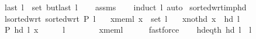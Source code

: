\begin{isabellebody}
\ \ \ {\isachardoublequoteopen}last\ l\ {\isasymnotin}\ set\ {\isacharparenleft}{\kern0pt}butlast\ l{\isacharparenright}{\kern0pt}{\isachardoublequoteclose}%
\endisataginvisible
{\isafoldinvisible}%
%
\isadeliminvisible
\isanewline
%
\endisadeliminvisible
%
\isadelimproof
\ \ %
\endisadelimproof
%
\isatagproof
{}\isamarkupfalse%
\ assms\isanewline
\ \ \isamarkupfalse%
\ {\isacharparenleft}{\kern0pt}induct\ l{\isacharparenright}{\kern0pt}\ auto%
\endisatagproof
{\isafoldproof}%
%
\isadelimproof
%
\endisadelimproof
%
\isadeliminvisible
%
\endisadeliminvisible
%
\isataginvisible
%
\isamarkuptrue%
\isamarkupfalse%
\ sorted{\isacharunderscore}{\kern0pt}wrt{\isacharunderscore}{\kern0pt}imp{\isacharunderscore}{\kern0pt}hd{\isacharcolon}{\kern0pt}\isanewline
\ \ \ l{\isacharunderscore}{\kern0pt}sorted{\isacharunderscore}{\kern0pt}wrt{\isacharcolon}{\kern0pt}\ {\isachardoublequoteopen}sorted{\isacharunderscore}{\kern0pt}wrt\ P\ l{\isachardoublequoteclose}\isanewline
\ \ \ x{\isacharunderscore}{\kern0pt}mem{\isacharunderscore}{\kern0pt}l{\isacharcolon}{\kern0pt}\ {\isachardoublequoteopen}x\ {\isasymin}\ set\ l{\isachardoublequoteclose}\isanewline
\ \ \ x{\isacharunderscore}{\kern0pt}not{\isacharunderscore}{\kern0pt}hd{\isacharcolon}{\kern0pt}\ {\isachardoublequoteopen}x\ {\isasymnoteq}\ hd\ l{\isachardoublequoteclose}\isanewline
\ \ \ {\isachardoublequoteopen}P\ {\isacharparenleft}{\kern0pt}hd\ l{\isacharparenright}{\kern0pt}\ x{\isachardoublequoteclose}%
\endisataginvisible
{\isafoldinvisible}%
%
\isadeliminvisible
\isanewline
%
\endisadeliminvisible
%
\isadelimproof
%
\endisadelimproof
%
\isatagproof
{}\isamarkupfalse%
\ {\isacharminus}{\kern0pt}\isanewline
\ \ \isamarkupfalse%
\ {\isachardoublequoteopen}l\ {\isasymnoteq}\ {\isacharbrackleft}{\kern0pt}{\isacharbrackright}{\kern0pt}{\isachardoublequoteclose}\isanewline
\ \ \ \ \isamarkupfalse%
\ x{\isacharunderscore}{\kern0pt}mem{\isacharunderscore}{\kern0pt}l\isanewline
\ \ \ \ \isamarkupfalse%
\ fastforce\isanewline
\ \ \isamarkupfalse%
\ hd{\isacharunderscore}{\kern0pt}eq{\isacharunderscore}{\kern0pt}{}th{\isacharcolon}{\kern0pt}\ {\isachardoublequoteopen}hd\ l\ {\isacharequal}{\kern0pt}\ l\ {\isacharbang}{\kern0pt}\ {}{\isachardoublequoteclose}\isanewline
\ \ \ \ \isamarkupfalse%

\end{isabellebody}
